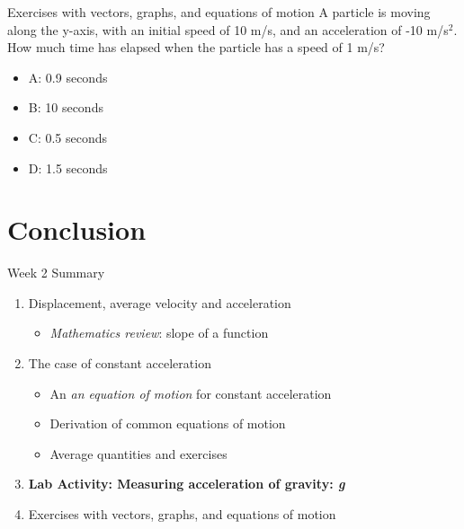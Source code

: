 \documentclass{beamer}
\begin{document}
\begin{frame}{Exercises with vectors, graphs, and equations of motion}
A particle is moving along the y-axis, with an initial speed of 10 m/s, and an acceleration of -10 m/s$^2$.  How much time has elapsed when the particle has a speed of 1 m/s?\\
\begin{itemize}
\item A: 0.9 seconds
\item B: 10 seconds
\item C: 0.5 seconds
\item D: 1.5 seconds
\end{itemize}
\end{frame}

\section{Conclusion}

\begin{frame}{Week 2 Summary}
\begin{enumerate}
\item Displacement, average velocity and acceleration
\begin{itemize}
\item \textit{Mathematics review}: slope of a function
\end{itemize}
\item The case of constant acceleration
\begin{itemize}
\item An \textit{an equation of motion} for constant acceleration
\item Derivation of \alert{common equations of motion}
\item Average quantities and exercises
\end{itemize}
\item \textbf{Lab Activity: Measuring acceleration of gravity: \textit{g}}
\item Exercises with vectors, graphs, and equations of motion
\end{enumerate}
\end{frame}
\end{document}
